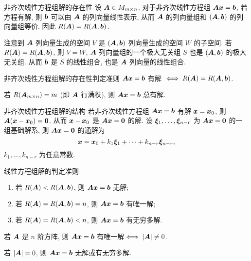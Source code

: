 \begin{frame}{非齐次线性方程组解的存在性}
	\onslide<+->
	设 $\bfA\in M_{m\times n}$.
	\onslide<+->
	对于非齐次线性方程组 $\bfA\bfx=\bfb$,
	\onslide<+->
	若方程有解, 则 $\bfb$ 可以由 $\bfA$ 的列向量线性表示, 从而 $\bfA$ 的列向量组和 $(\bfA,\bfb)$ 的列向量组等价.
	\onslide<+->
	因此 $R(\bfA)=R(\bfA,\bfb)$.

	\onslide<+->
	注意到 $\bfA$ 列向量生成的空间 $V$ 是 $(\bfA,\bfb)$ 列向量生成的空间 $W$ 的子空间.
	\onslide<+->
	若 $R(\bfA)=R(\bfA,\bfb)$, 则 $V=W$, $\bfA$ 列向量组的一个极大无关组 $S$ 也是 $(\bfA,\bfb)$ 的极大无关组.
	\onslide<+->
	从而 $\bfb$ 是 $S$ 的线性组合, 也是 $\bfA$ 列向量的线性组合.

	\onslide<+->
	\begin{second}{非齐次线性方程组解的存在性判定准则}
		$\bfA \bfx=\bfb$ 有解 $\iff R(\bfA)=R(\bfA,\bfb)$.
	\end{second}
	\onslide<+->
	\begin{corollary}
		若 $R(\bfA_{m\times n})=m$ (即 $\bfA$ 行满秩), 则 $\bfA \bfx=\bfb$ 总有解.
	\end{corollary}
\end{frame}


\begin{frame}{非齐次线性方程组解的结构}
	\onslide<+->
	若非齐次线性方程组 $\bfA\bfx=\bfb$ 有解 $\bfx=\bfx_0$,
	则 $\bfA(\bfx-\bfx_0)={\bf0}$.
	\onslide<+->
	从而 $\bfx-\bfx_0$ 是 $\bfA\bfx={\bf0}$ 的解.
	\onslide<+->
	设 $\bmx_1,\dots,\bmx_{n-r}$ 为 $\bfA\bfx={\bf0}$ 的一组基础解系, 则 $\bfA\bfx={\bf0}$ 的通解为
	\[\bfx=\bfx_0+k_1\bmx_1+\cdots+k_{n-r}\bmx_{n-r},\]
	$k_1,\dots,k_{n-r}$ 为任意常数.

	\onslide<+->
	\begin{second}{线性方程组解的判定准则}
		\begin{enumerate}
			\item 若 $R(\bfA)<R(\bfA,\bfb)$, 则 $\bfA \bfx=\bfb$ 无解;
			\item 若 $R(\bfA)=R(\bfA,\bfb)=n$, 则 $\bfA \bfx=\bfb$ 有唯一解;
			\item 若 $R(\bfA)=R(\bfA,\bfb)<n$, 则 $\bfA \bfx=\bfb$ 有无穷多解.
		\end{enumerate}
	\end{second}
	\onslide<+->
	\begin{corollary}
		若 $\bfA$ 是 $n$ 阶方阵, 则 $\bfA\bfx=\bfb$ 有唯一解$\iff|\bfA|\neq0$.
	\end{corollary}
	\onslide<+->
	若 $|\bfA|=0$, 则 $\bfA\bfx=\bfb$ 无解或有无穷多解.
\end{frame}


